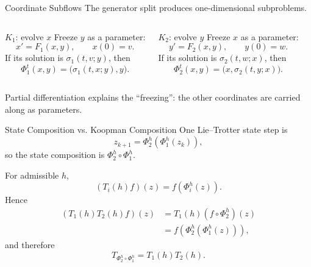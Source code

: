 \documentclass[aspectratio=169,11pt]{beamer}
\begin{document}
\begin{frame}{Coordinate Subflows}
\small
The generator split produces one-dimensional subproblems.

\begin{columns}[T,onlytextwidth]
\begin{block}{\(K_1\): evolve \(x\)}
Freeze \(y\) as a parameter:
\[
x'=F_1(x,y),\qquad x(0)=v.
\]
If its solution is \(\sigma_1(t,v;y)\), then
\[
\boxed{\Phi_1^t(x,y)=\bigl(\sigma_1(t,x;y),y\bigr).}
\]
\end{block}

\begin{block}{\(K_2\): evolve \(y\)}
Freeze \(x\) as a parameter:
\[
y'=F_2(x,y),\qquad y(0)=w.
\]
If its solution is \(\sigma_2(t,w;x)\), then
\[
\boxed{\Phi_2^t(x,y)=\bigl(x,\sigma_2(t,y;x)\bigr).}
\]
\end{block}
\end{columns}

\begin{center}
\small Partial differentiation explains the ``freezing'': the other coordinates are carried along as parameters.
\end{center}
\end{frame}

\begin{frame}{State Composition vs. Koopman Composition}
\small
One Lie--Trotter state step is
\[
\boxed{z_{k+1}=\Phi_2^h(\Phi_1^h(z_k))},
\]
so the state composition is \(\Phi_2^h\circ\Phi_1^h\).

For admissible \(h\),
\[
(T_i(h)f)(z)=f(\Phi_i^h(z)).
\]
Hence
\[
\begin{aligned}
(T_1(h)T_2(h)f)(z)
&=T_1(h)(f\circ\Phi_2^h)(z)\\
&=f(\Phi_2^h(\Phi_1^h(z))),
\end{aligned}
\]
and therefore
\[
\boxed{T_{\Phi_2^h\circ\Phi_1^h}=T_1(h)T_2(h).}
\]

\end{frame}
\end{document}
